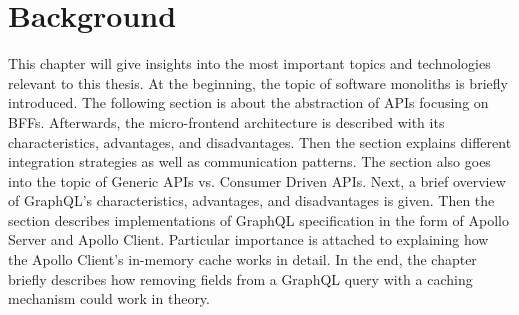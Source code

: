 \chapter{Background}\label{chapter:background}

This chapter will give insights into the most important topics and technologies relevant to this thesis. At the beginning, the topic of software monoliths is briefly introduced. The following section is about the abstraction of \acp{API} focusing on \acp{BFF}. Afterwards, the micro-frontend architecture is described with its characteristics, advantages, and disadvantages. Then the section explains different integration strategies as well as communication patterns. The section also goes into the topic of Generic \acp{API} vs. Consumer Driven \acp{API}. Next, a brief overview of GraphQL's characteristics, advantages, and disadvantages is given. Then the section describes implementations of GraphQL specification in the form of Apollo Server and Apollo Client. Particular importance is attached to explaining how the Apollo Client's in-memory cache works in detail. In the end, the chapter briefly describes how removing fields from a GraphQL query with a caching mechanism could work in theory.









